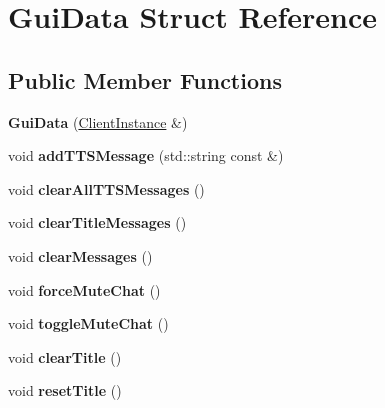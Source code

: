 \hypertarget{struct_gui_data}{}\section{Gui\+Data Struct Reference}
\label{struct_gui_data}
\subsection*{Public Member Functions}
\begin{DoxyCompactItemize}
\item 
\mbox{\label{struct_gui_data_a8cd33473d5e323142d639cb0041b084b}} 
{\bfseries Gui\+Data} (\mbox{\hyperlink{struct_client_instance}{Client\+Instance}} \&)
\item 
\mbox{\label{struct_gui_data_a2974ad8ac92d98b0c463f188bfc24a7e}} 
void {\bfseries add\+T\+T\+S\+Message} (std\+::string const \&)
\item 
\mbox{\label{struct_gui_data_aafb5014f7535c736606f33832135d7e3}} 
void {\bfseries clear\+All\+T\+T\+S\+Messages} ()
\item 
\mbox{\label{struct_gui_data_ac0e6a67243042cdd37da149b582edd5c}} 
void {\bfseries clear\+Title\+Messages} ()
\item 
\mbox{\label{struct_gui_data_aeb351a7f68229f8b94808a49a8c6729f}} 
void {\bfseries clear\+Messages} ()
\item 
\mbox{\label{struct_gui_data_a3909636b3ac325d04a505a119ff101fe}} 
void {\bfseries force\+Mute\+Chat} ()
\item 
\mbox{\label{struct_gui_data_a1ea116fd5684f05405d4845e129e95f2}} 
void {\bfseries toggle\+Mute\+Chat} ()
\item 
\mbox{\label{struct_gui_data_aa615eef40f5ac2c259ce025a1cdfebdd}} 
void {\bfseries clear\+Title} ()
\item 
\mbox{\label{struct_gui_data_aa262085206c944b0d8bdceefec899f42}} 
void {\bfseries reset\+Title} ()
\item 
\mbox{\label{struct_gui_data_ac54039a51bf1fd8286df7d63cdfc50c2}} 

\end{DoxyCompactItemize}
